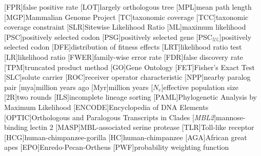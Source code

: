 
[FPR]{false positive rate}
[LOT]{largely orthologous tree}
[MPL]{mean path length}
[MGP]{Mammalian Genome Project}
[TC]{taxonomic coverage}
[TCC]{taxonomic coverage constraint}
[SLR]{Sitewise Likelihood Ratio}
[ML]{maximum likelihood}
[PSC]{positively selected codon}
[PSG]{positively selected gene}
[PSC$_{5\%}$]{positively selected codon}
[DFE]{distribution of fitness effects}
[LRT]{likelihood ratio test}
[LR]{likelihood ratio}
[FWER]{family-wise error rate}
[FDR]{false discovery rate}
[TPM]{truncated product method}
[GO]{Gene Ontology}
[FET]{Fisher's Exact Test}
[SLC]{solute carrier}
[ROC]{receiver operator characteristic}
[NPP]{nearby paralog pair}
[mya]{million years ago}
[Myr]{million years}
[$N_{e}$]{effective population size}
[2R]{two rounds}
[ILS]{incomplete lineage sorting}
[PAML]{Phylogenetic Analysis by Maximum Likelihood}
[ENCODE]{Encyclopedia of DNA Elements}
[OPTIC]{Orthologous and Paralogous Transcripts in Clades}
[\emph{MBL2}]{mannose-binding lectin 2}
[MASP]{MBL-associated serine protease}
[TLR]{Toll-like receptor}
[HCG]{human-chimpanzee-gorilla}
[HC]{human-chimpanzee}
[AGA]{African great apes}
[EPO]{Enredo-Pecan-Ortheus}
[PWF]{probability weighting function}

\newcommand{\tocite}[2]{}

\newcommand{\TODO}[1]{\textcolor{red}{TODO} \todo{#1}\xspace}
\newcommand{\draft}[1]{\textcolor{gray}{[#1]}\xspace}

\newcommand{\gene}[1]{\emph{#1}}
\newcommand{\species}[1]{\emph{#1}}

\newcommand{\syn}{synonymous\xspace}
\newcommand{\nsyn}{nonsynonymous\xspace}

\newcommand{\sw}{sitewise\xspace}
\newcommand{\ml}{maximum likelihood\xspace}

\newcommand{\slr}{SLR\xspace}
\newcommand{\pamlTwo}{PAML M2\xspace}
\newcommand{\pamlEight}{PAML M8\xspace}

